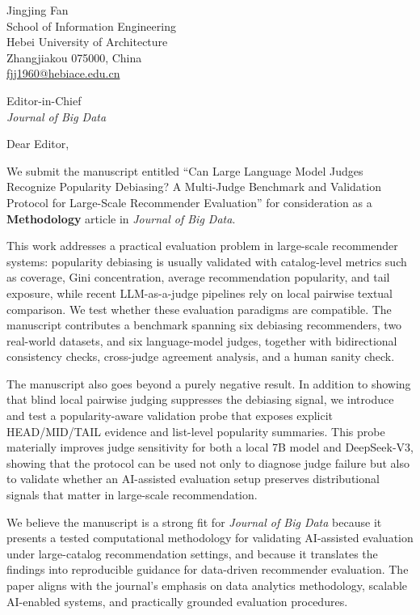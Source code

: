 \documentclass[11pt]{article}
\begin{document}
\begin{flushright}
Jingjing Fan\\
School of Information Engineering\\
Hebei University of Architecture\\
Zhangjiakou 075000, China\\
\href{mailto:fjj1960@hebiace.edu.cn}{fjj1960@hebiace.edu.cn}
\end{flushright}

\vspace{1em}

Editor-in-Chief\\
\emph{Journal of Big Data}

\vspace{1em}

Dear Editor,

We submit the manuscript entitled ``Can Large Language Model Judges Recognize Popularity Debiasing? A Multi-Judge Benchmark and Validation Protocol for Large-Scale Recommender Evaluation'' for consideration as a \textbf{Methodology} article in \emph{Journal of Big Data}.

This work addresses a practical evaluation problem in large-scale recommender systems: popularity debiasing is usually validated with catalog-level metrics such as coverage, Gini concentration, average recommendation popularity, and tail exposure, while recent LLM-as-a-judge pipelines rely on local pairwise textual comparison. We test whether these evaluation paradigms are compatible. The manuscript contributes a benchmark spanning six debiasing recommenders, two real-world datasets, and six language-model judges, together with bidirectional consistency checks, cross-judge agreement analysis, and a human sanity check.

The manuscript also goes beyond a purely negative result. In addition to showing that blind local pairwise judging suppresses the debiasing signal, we introduce and test a popularity-aware validation probe that exposes explicit HEAD/MID/TAIL evidence and list-level popularity summaries. This probe materially improves judge sensitivity for both a local 7B model and DeepSeek-V3, showing that the protocol can be used not only to diagnose judge failure but also to validate whether an AI-assisted evaluation setup preserves distributional signals that matter in large-scale recommendation.

We believe the manuscript is a strong fit for \emph{Journal of Big Data} because it presents a tested computational methodology for validating AI-assisted evaluation under large-catalog recommendation settings, and because it translates the findings into reproducible guidance for data-driven recommender evaluation. The paper aligns with the journal's emphasis on data analytics methodology, scalable AI-enabled systems, and practically grounded evaluation procedures.
\end{document}
